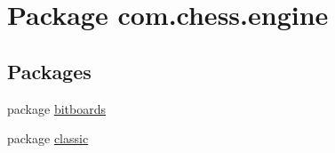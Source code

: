 \hypertarget{namespacecom_1_1chess_1_1engine}{}\section{Package com.\+chess.\+engine}
\label{namespacecom_1_1chess_1_1engine}
\subsection*{Packages}
\begin{DoxyCompactItemize}
\item 
package \mbox{\hyperlink{namespacecom_1_1chess_1_1engine_1_1bitboards}{bitboards}}
\item 
package \mbox{\hyperlink{namespacecom_1_1chess_1_1engine_1_1classic}{classic}}
\end{DoxyCompactItemize}

